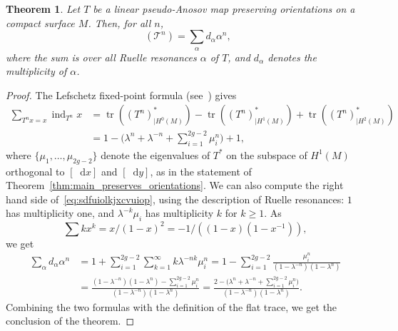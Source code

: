 \documentclass[10pt]{amsart}
\newcommand{\boT}{\mathcal{T}}
\newcommand{\dd}{\mathop{}\!\mathrm{d}}
\newcommand{\pareg}[1]{\bigl(#1\bigr)}
\newcommand{\paregg}[1]{\biggl(#1\biggr)}
\newcommand{\restr}{|}
\DeclareMathOperator{\ind}{ind}
\DeclareMathOperator{\flattr}{\mathrm{tr}^{\flat}}
\DeclareMathOperator{\tr}{tr}
\newtheorem{thm}{Theorem}[section]
\theoremstyle{definition}
\numberwithin{equation}{section}
\begin{document}
\begin{thm}
\label{thm:trace_formula} Let $T$ be a linear pseudo-Anosov map preserving
orientations on a compact surface $M$. Then, for all $n$,
\begin{equation}
\label{eq:sdfuiolkjxcvuiop}
\flattr(\boT^n) = \sum_\alpha d_\alpha \alpha^n,
\end{equation}
where the sum is over all Ruelle resonances $\alpha$ of $T$, and $d_\alpha$
denotes the multiplicity of $\alpha$.
\end{thm}
\begin{proof}
The Lefschetz fixed-point formula (see~\cite[Th.\,8.6.2]{katok}) gives
\begin{align*}
\sum_{T^n x = x} \ind_{T^n} x
&= \tr((T^n)_{\restr H^0(M)}^*) - \tr((T^n)_{\restr H^1(M)}^*) + \tr((T^n)_{\restr H^2(M)}^*)
\\[-5pt]
& = 1 - \paregg{\lambda^n + \lambda^{-n} + \sum_{i=1}^{2g-2} \mu_i^n} + 1,
\end{align*}
where $\{\mu_1,\dotsc, \mu_{2g-2}\}$ denote the eigenvalues of $T^*$ on the
subspace of $H^1(M)$ orthogonal to $[\dd x]$ and $[\dd y]$, as in the
statement of Theorem~\ref{thm:main_preserves_orientations}. We can also
compute the right hand side of~\eqref{eq:sdfuiolkjxcvuiop}, using the
description of Ruelle resonances: $1$ has multiplicity one, and
$\lambda^{-k}\mu_i$ has multiplicity $k$ for $k\geq 1$. As
\[
\sum k x^k =
x/(1-x)^2 = -1/((1-x)(1-x^{-1})),
\]
we get
\begin{align*}
\sum_\alpha d_\alpha \alpha^n
&= 1 + \sum_{i=1}^{2g-2} \sum_{k=1}^\infty k \lambda^{-nk} \mu_i^n
= 1 - \sum_{i=1}^{2g-2} \frac{\mu_i^n}{(1-\lambda^{-n})(1-\lambda^n)}
\\&
= \frac{(1-\lambda^{-n})(1-\lambda^n) - \sum_{i=1}^{2g-2}\mu_i^n}{(1-\lambda^{-n})(1-\lambda^n)}
= \frac{2 - \pareg{\lambda^n + \lambda^{-n} +\sum_{i=1}^{2g-2}\mu_i^n}}{(1-\lambda^{-n})(1-\lambda^n)}.
\end{align*}
Combining the two formulas with the definition of the flat trace, we get the
conclusion of the theorem.
\end{proof}
\end{document}
